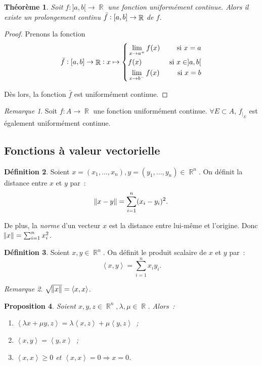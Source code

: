 \documentclass{article}
\DeclareMathOperator{\R}{\mathbb R}
\newcommand{\scpr}[2]{{\left\langle#1, #2\right\rangle}}
\newcommand{\ab}{\interval ab}
\newcommand{\fabr}[1]{#1 : \ab \to \R}
\newtheorem{thm}{Théorème}[section]
\newtheorem{prp}[thm]{Proposition}
\theoremstyle{definition}
\newtheorem{déf}[thm]{Définition}
\theoremstyle{remark}
\newtheorem*{rmq}{Remarque}
\begin{document}
		\begin{thm} Soit $f : ]a, b[ \to \R$ une fonction uniformément continue. Alors il existe un \textit{prolongement continu} $\fabr {\bar f}$ de $f$.
		\end{thm}

		\begin{proof} Prenons la fonction
		\[\fabr {\bar f} : x \mapsto \left\{\begin{aligned}&\lim_{x \to a^+}f(x) &\text{ si } x = a\\&f(x) &\text{ si } x \in ]a, b[\\&\lim_{x \to b^-}f(x) &\text{ si } x = b\end{aligned}\right.\]

		Dès lors, la fonction $\bar f$ est uniformément continue. \end{proof}

		\begin{rmq} Soit $f : A \to \R$ une fonction uniformément continue. $\forall E \subset A$, $f_{|_E}$ est également uniformément continue. \end{rmq}

	\subsection{Fonctions à valeur vectorielle}

		\begin{déf} Soient $x = (x_1, \ldots, x_n), y = (y_1, \ldots, y_n) \in \R^n$. On définit la distance entre $x$ et $y$ par~:
		\[\norm{x-y} = \sum_{i=1}^n(x_i-y_i)^2.\]

		De plus, la \textit{norme} d'un vecteur $x$ est la distance entre lui-même et l'origine. Donc $\norm x = \sum_{i=1}^nx_i^2$. \end{déf}

		\begin{déf} Soient $x, y \in \R^n$. On définit le produit scalaire de $x$ et $y$ par~:
		\[\scpr xy = \sum_{i=1}^nx_iy_i.\]
		\end{déf}

		\begin{rmq} $\sqrt {\norm x} = \scpr xx$. \end{rmq}

		\begin{prp} Soient $x, y, z \in \R^n, \lambda, \mu \in \R$. Alors~:

		\begin{enumerate}
			\item $\scpr {\lambda x + \mu y}z = \lambda \scpr xz + \mu \scpr yz$~;
			\item $\scpr xy = \scpr yx$~;
			\item $\scpr xx \geq 0$ et $\scpr xx = 0 \Rightarrow x = 0$.
		\end{enumerate}
		\end{prp}
\end{document}
